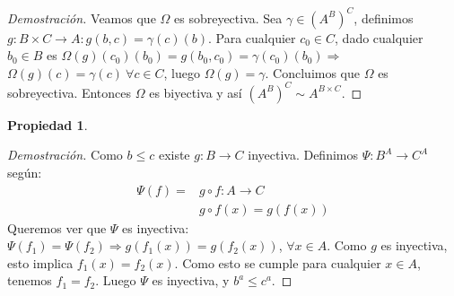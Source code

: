 \documentclass{article}
\newtheorem*{propiedad}{Propiedad}
\begin{document}
\begin{proof}[Demostración]
Veamos que $\Omega$ es sobreyectiva. Sea $\gamma \in (A^B)^C$, definimos $g: B\times C \rightarrow A : g(b,c) = \gamma(c)(b)$. Para cualquier $c_0 \in C$, dado cualquier $b_0 \in B$ es $\Omega(g)(c_0)(b_0) = g(b_0,c_0) = \gamma(c_0)(b_0) \Rightarrow$ $\Omega(g)(c) = \gamma(c) \ \forall c \in C$, luego $\Omega(g) = \gamma$. Concluimos que $\Omega$ es sobreyectiva.
\newline \newline
Entonces $\Omega$ es biyectiva y así $(A^B)^C \sim A^{B\times C}$. \newline
\end{proof}

\begin{propiedad}
\end{propiedad}
\begin{proof}[Demostración]
Como $b \le c$ existe $g: B \rightarrow C$ inyectiva. \newline Definimos $\Psi : B^A \rightarrow C^A$ según:
\begin{align*}
\Psi(f) =& g \circ f: A \rightarrow C \\
& g \circ f(x) = g(f(x))
\end{align*}
Queremos ver que $\Psi$ es inyectiva: $\Psi(f_1) = \Psi(f_2) \Rightarrow g(f_1(x)) = g(f_2(x))$, $\forall x \in A$. Como $g$ es inyectiva, esto implica $f_1(x) = f_2(x)$. Como esto se cumple para cualquier $x \in A$, tenemos $f_1 = f_2$. Luego $\Psi$ es inyectiva, y $b^a \le c^a$.
\end{proof}
\end{document}
